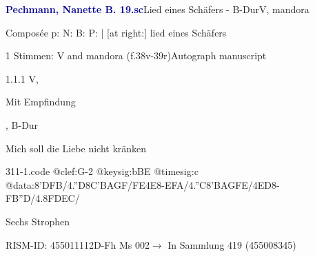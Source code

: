 \documentclass[twocolumn]{book}
\begin{document}
\par \vspace{7pt} \textcolor{darkblue}{\textbf{Pechmann, Nanette B.  19.sc}}\hfillplus{\textbf{[311]}}\newline Lied eines Schäfers - B-Dur\newline V, mandora
\par \begin{itshape}[heading, f.38v:] Composée p: N: B: P: | [at right:] lied eines Schäfers\end{itshape} 
\par \textcolor{darkblue}{}  1 Stimmen: V and mandora  (f.38v-39r)\newline Autograph manuscript
\par 1.1.1  V, \begin{itshape}Mit Empfindung\end{itshape}, B-Dur\newline \begin{footnotesize} Mich soll die Liebe nicht kränken \end{footnotesize}  
\begin{filecontents*}{311-1.code}
@clef:G-2
@keysig:bBE
@timesig:c
@data:8'DFB/4.''D8C'BAGF/{FE}4E8-EFA/4.''C8'BAGFE/4ED8-FB''D/4.8FDEC/
\end{filecontents*}
\newline
%
\par Sechs Strophen
\par RISM-ID: 455011112\newline D-Fh  Ms 002\newline $\rightarrow$ In Sammlung 419 (455008345)
      
\end{document}
